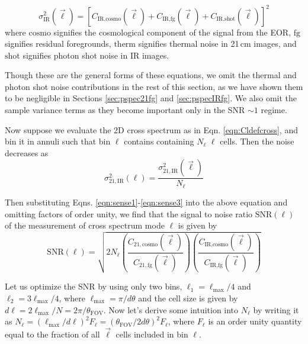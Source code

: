 \documentclass{emulateapj}
\newcommand{\IR}{\text{IR}}
\newcommand{\therm}{\text{therm}}
\newcommand{\cosmo}{\text{cosmo}}
\newcommand{\fg}{\text{fg}}
\newcommand{\shot}{\text{shot}}
\newcommand{\SNR}{\text{SNR}}
\begin{document}
\begin{equation}
\label{eqn:sense3}
	\sigma_{\IR}^2(\vec{\ell})=[C_{\IR,\cosmo}(\vec{\ell})+C_{\IR,\fg}(\vec{\ell})+C_{\IR,\shot}(\vec{\ell})]^2
\end{equation}
where $\cosmo$ signifies the cosmological component of the signal from the EOR, $\fg$ signifies residual foregrounds, $\therm$ signifies thermal noise in 21\,cm images, and $\shot$ signifies photon shot noise in IR images. 


Though these are the general forms of these equations, we omit the thermal and photon shot noise contributions in the rest of this section, as we have shown them to be negligible in Sections \ref{sec:pspec21fg} and \ref{sec:pspecIRfg}. We also omit the sample variance terms as they become important only in the SNR $\sim1$ regime. 

Now suppose we evaluate the 2D cross spectrum as in Eqn. \ref{eqn:Cldefcross}, and bin it in annuli such that bin $\ell$ contains containing $N_\ell$ $\ell$ cells. Then the noise decreases as
\begin{equation}
	\sigma_{21,\IR}^2(\ell) = \frac{\sigma_{21,\IR}^2(\vec{\ell}) }{N_\ell}
\end{equation}

Then substituting Eqns. \ref{eqn:sense1}-\ref{eqn:sense3} into the above equation and omitting factors of order unity, we find that the signal to noise ratio $\SNR(\ell)$ of the measurement of cross spectrum mode $\ell$ is given by
\begin{equation}
	\SNR(\ell) = \sqrt{
		2N_\ell
	\left(\frac{C_{21,\cosmo}(\vec{\ell})  }{ C_{21,\fg}(\vec{\ell}) }\right)
	\left(\frac{C_{\IR,\cosmo}(\vec{\ell})  }{ C_{\IR,\fg}(\vec{\ell}) }\right)
	}
\end{equation}

Let us optimize the SNR by using only two bins, $\ell_1=\ell_\text{max}/4$ and $\ell_2=3\ell_\text{max}/4$, where $\ell_\text{max}=\pi/d\theta$ and the cell size is given by $d\ell=2\ell_\text{max}/N=2\pi/\theta_\text{FOV}$. Now let's derive some intuition into $N_\ell$ by writing it as $N_\ell=(\ell_\text{max}/d\ell)^2F_\ell=(\theta_\text{FOV}/2d\theta)^2F_\ell$, where $F_\ell$ is an order unity quantity equal to the fraction of all $\vec{\ell}$ cells included in bin $\ell$.

\end{document}
